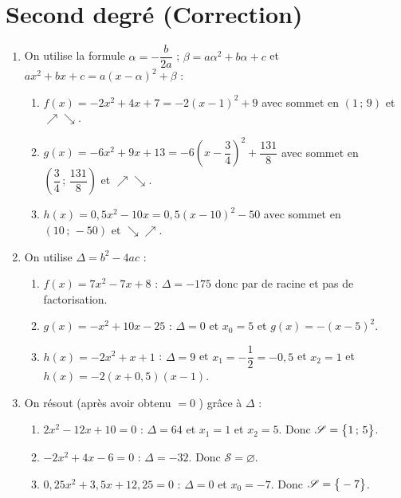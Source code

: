 \documentclass[a4paper,11pt]{article}
\author{Pierquet}
\title{\nomfichier}
\begin{document}
\pagestyle{fancy}


\part{Second degré (Correction)}

\medskip


\begin{enumerate}
	\item On utilise la formule $\alpha=-\dfrac{b}{2a}$ ; $\beta=a\alpha^2+b\alpha+c$ et $ax^2+bx+c=a(x-\alpha)^2+\beta$ :
	\begin{enumerate}
		\item $f(x)=-2x^2+4x+7 = -2(x-1)^2+9$ avec sommet en $(1\,;\,9)$ et $\nearrow\searrow$.
		\item $g(x)=-6x^2+9x+13=-6\left(x-\dfrac34\right)^2+\dfrac{131}{8}$ avec sommet en $\left(\dfrac34\,;\,\dfrac{131}{8}\right)$ et $\nearrow\searrow$.
		\item $h(x)=0,5x^2-10x=0,5(x-10)^2-50$ avec sommet en $(10\,;\,-50)$ et $\searrow\nearrow$.
	\end{enumerate}
	\item On utilise $\Delta=b^2-4ac$ :
	\begin{enumerate}
		\item $f(x)=7x^2-7x+8$ : $\Delta=-175$ donc par de racine et pas de factorisation.
		\item $g(x)=-x^2+10x-25$ : $\Delta=0$ et $x_0=5$ et $g(x)=-(x-5)^2$.
		\item $h(x)=-2x^2+x+1$ : $\Delta=9$ et $x_1 = -\dfrac12=-0,5$ et $x_2=1$ et $h(x)=-2(x+0,5)(x-1)$.
	\end{enumerate}
	\item On résout (après avoir obtenu \og $=0$ \fg) grâce à $\Delta$ :
	\begin{enumerate}
		\item $2x^2-12x+10=0$ : $\Delta=64$ et $x_1=1$ et $x_2=5$. Donc $\mathscr{S}=\left\lbrace \strut 1\,;\,5 \right\rbrace$.
		\item $-2x^2+4x-6=0$ : $\Delta=-32$. Donc $\mathscr{S}=\varnothing$.
		\item $0,25x^2+3,5x+12,25=0$ : $\Delta=0$ et $x_0=-7$. Donc $\mathscr{S}=\left\lbrace \strut -7 \right\rbrace$.
	\end{enumerate}
\end{enumerate}
\end{document}

